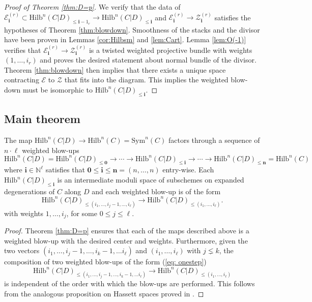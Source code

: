 \documentclass[10.5pt]{amsart}
\theoremstyle{definition}
\newenvironment{customthm}[1]
  {\renewcommand\theinnercustomthm{#1}\innercustomthm}
  {\endinnercustomthm}
\theoremstyle{definition}
\theoremstyle{definition}
\theoremstyle{definition}
\newcommand{\Hilb}{\mathrm{Hilb}}
\newcommand{\Sym}{\mathrm{Sym}}
\newcommand{\ra}{\rightarrow}
\newcommand{\cZ}{\mathcal{Z}}
\newcommand{\cE}{\mathcal{E}}
\newcommand{\bi}{\boldsymbol{i}}
\begin{document}
\begin{proof}[Proof of Theorem \ref{thm:D=p}]
We verify that the data of $\cE^{(r)}_{\bi}\subset \Hilb^n(C|D)_{\le \bi-1_r}\to \Hilb^n(C|D)_{\le \bi}$ and $\cE_{\bi}^{(r)}\to \cZ^{(r)}_{\bi}$ satisfies the hypotheses of Theorem \ref{thm:blowdown}. Smoothness of the stacks and the divisor have been proven in Lemmas \ref{cor:Hilbsm} and \ref{lem:Cart}. Lemma \ref{lem:O(-1)} verifies that $\cE^{(r)}_{\bi}\to \cZ^{(r)}_{\bi}$ is a twisted weighted projective bundle with weights $(1,\dots, i_r)$ and proves the desired statement about normal bundle of the divisor. Theorem \ref{thm:blowdown} then implies that there exists a unique space contracting $\cE$ to $\cZ$ that fits into the diagram. This implies the weighted blow-down must be isomorphic to $\Hilb^n(C|D)_{\le \bi}$.
\end{proof}
\subsection{Main theorem}

\begin{customthm}{A} \label{thm:main}
    The map $\Hilb^n(C|D)\to \Hilb^n(C) = \Sym^n(C)$ factors through a sequence of $n\cdot \ell$ weighted blow-ups $$\Hilb^n(C|D)=\Hilb^n(C|D)_{\le \mathbf{0}} \to \cdots  \to \Hilb^n(C|D)_{\leq \bi}  \to \cdots \to \Hilb^n(C|D)_{\le \boldsymbol{n}}=\Hilb^n(C)$$ where $\bi\in \mathbb{N}^\ell$ satisfies that $\mathbf{0}\leq \bi\leq \boldsymbol{n} = (n,\dots,n)$ entry-wise. Each $\Hilb^n(C|D)_{\leq \bi}$ is an intermediate moduli space of subschemes on expanded degenerations of $C$ along $D$ and each weighted blow-up is of the form \begin{equation} \label{eq: onestep}
       \Hilb^n(C|D)_{\le (i_1,\dots, i_j-1,\dots , i_\ell)} \ra \Hilb^n(C|D)_{\le (i_1, \dots ,i_\ell)}.
    \end{equation}
     with weights $1, \dots , i_j$, for some $0 \le j \le \ell$.
\end{customthm}

\begin{proof}
    Theorem \ref{thm:D=p} ensures that each of the maps described above is a weighted blow-up with the desired center and weights. Furthermore, given the two vectors $(i_1,\dots, i_j-1,\dots , i_k-1, \dots i_\ell)$ and $(i_1, \dots ,i_\ell)$ with $j \lneq k$, the composition of two weighted blow-ups of the form (\ref{eq: onestep}) $$\Hilb^n(C|D)_{\le (i_1,\dots, i_j-1,\dots , i_k-1, \dots i_\ell)} \ra \Hilb^n(C|D)_{\le (i_1, \dots ,i_\ell)} $$ is independent of the order with which the blow-ups are performed. This follows from the analogous proposition on Hassett spaces proved in \cite[Proposition 4.4]{hassett}.
\end{proof}
\end{document}
